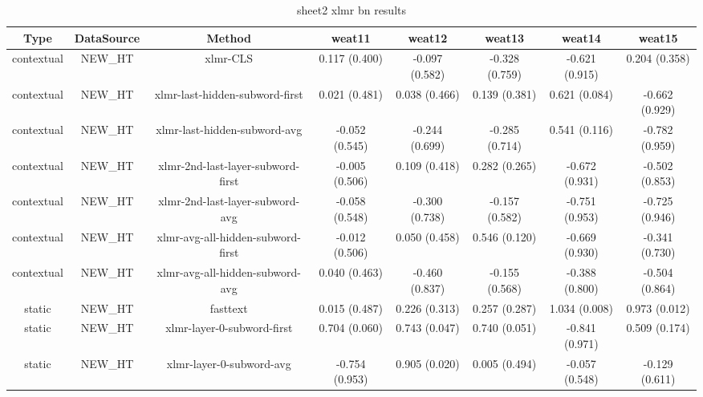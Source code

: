 \begin{sidewaystable}[htb]
    \centering
    \caption{sheet2 xlmr bn results}
    \label{appendix_tab:sheet2_xlmr_bn_results}
    \small
    \begin{tabular}{@{}cccccccc@{}}
        \toprule
        Type & DataSource & Method & weat11 & weat12 & weat13 & weat14 & weat15 \\
        \midrule
        contextual & NEW\_HT & xlmr-CLS & 0.117 (0.400) & -0.097 (0.582) & -0.328 (0.759) & -0.621 (0.915) & 0.204 (0.358) \\
        contextual & NEW\_HT & xlmr-last-hidden-subword-first & 0.021 (0.481) & 0.038 (0.466) & 0.139 (0.381) & 0.621 (0.084) & -0.662 (0.929) \\
        contextual & NEW\_HT & xlmr-last-hidden-subword-avg & -0.052 (0.545) & -0.244 (0.699) & -0.285 (0.714) & 0.541 (0.116) & -0.782 (0.959) \\
        contextual & NEW\_HT & xlmr-2nd-last-layer-subword-first & -0.005 (0.506) & 0.109 (0.418) & 0.282 (0.265) & -0.672 (0.931) & -0.502 (0.853) \\
        contextual & NEW\_HT & xlmr-2nd-last-layer-subword-avg & -0.058 (0.548) & -0.300 (0.738) & -0.157 (0.582) & -0.751 (0.953) & -0.725 (0.946) \\
        contextual & NEW\_HT & xlmr-avg-all-hidden-subword-first & -0.012 (0.506) & 0.050 (0.458) & 0.546 (0.120) & -0.669 (0.930) & -0.341 (0.730) \\
        contextual & NEW\_HT & xlmr-avg-all-hidden-subword-avg & 0.040 (0.463) & -0.460 (0.837) & -0.155 (0.568) & -0.388 (0.800) & -0.504 (0.864) \\
        static & NEW\_HT & fasttext & 0.015 (0.487) & 0.226 (0.313) & 0.257 (0.287) & 1.034 (0.008) & 0.973 (0.012) \\
        static & NEW\_HT & xlmr-layer-0-subword-first & 0.704 (0.060) & 0.743 (0.047) & 0.740 (0.051) & -0.841 (0.971) & 0.509 (0.174) \\
        static & NEW\_HT & xlmr-layer-0-subword-avg & -0.754 (0.953) & 0.905 (0.020) & 0.005 (0.494) & -0.057 (0.548) & -0.129 (0.611) \\
        \bottomrule
    \end{tabular}
\end{sidewaystable}